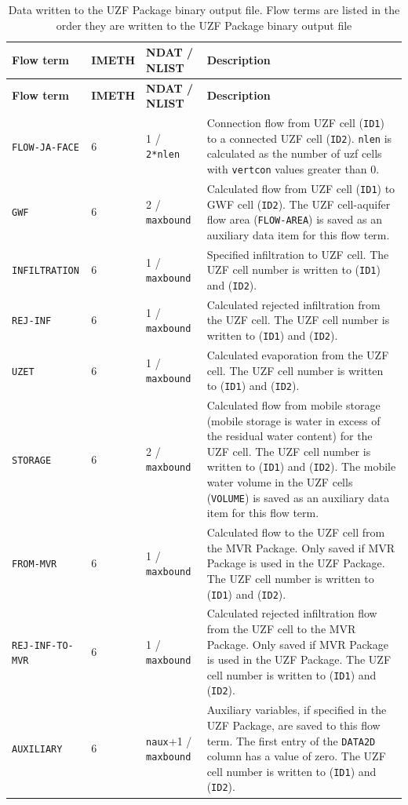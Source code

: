 \newpage
\begin{longtable}{p{3.5cm} p{2cm} p{3.5cm} p{6.5cm}}
\caption{Data written to the UZF Package binary output file. Flow terms are listed in the order they are written to the UZF Package binary output file} \tabularnewline
\hline
\hline
\textbf{Flow term} & \textbf{IMETH} & \textbf{NDAT / NLIST} & \textbf{Description} \\
\hline
\endfirsthead

\hline
\hline
\textbf{Flow term} & \textbf{IMETH} & \textbf{NDAT / NLIST} & \textbf{Description} \\
\hline
\endhead

\hline
\endfoot

\texttt{FLOW-JA-FACE} & 6 & 1 / \texttt{2*nlen} & Connection flow from UZF cell (\texttt{ID1}) to a connected UZF cell (\texttt{ID2}). \texttt{nlen} is calculated as the number of uzf cells with \texttt{vertcon} values greater than 0.\\
\texttt{GWF} & 6 & 2 / \texttt{maxbound} & Calculated flow from UZF cell (\texttt{ID1}) to GWF cell (\texttt{ID2}). The UZF cell-aquifer flow area (\texttt{FLOW-AREA}) is saved as an auxiliary data item for this flow term.\\
\texttt{INFILTRATION} & 6 & 1 / \texttt{maxbound} & Specified infiltration to UZF cell. The UZF cell number is written to (\texttt{ID1}) and (\texttt{ID2}). \\
\texttt{REJ-INF} & 6 & 1 / \texttt{maxbound} & Calculated rejected infiltration from the UZF cell. The UZF cell number is written to (\texttt{ID1}) and (\texttt{ID2}). \\
\texttt{UZET} & 6 & 1 / \texttt{maxbound} & Calculated evaporation from the UZF cell. The UZF cell number is written to (\texttt{ID1}) and (\texttt{ID2}). \\
\texttt{STORAGE} & 6 & 2 / \texttt{maxbound} & Calculated flow from mobile storage (mobile storage is water in excess of the residual water content) for the UZF cell. The UZF cell number is written to (\texttt{ID1}) and (\texttt{ID2}). The mobile water volume in the UZF cells (\texttt{VOLUME}) is saved as an auxiliary data item for this flow term.  \\
\texttt{FROM-MVR} & 6 & 1 / \texttt{maxbound} & Calculated flow to the UZF cell from the MVR Package. Only saved if MVR Package is used in the UZF Package. The UZF cell number is written to (\texttt{ID1}) and (\texttt{ID2}). \\
\texttt{REJ-INF-TO-MVR} & 6 & 1 / \texttt{maxbound} & Calculated rejected infiltration flow from the UZF cell to the MVR Package. Only saved if MVR Package is used in the UZF Package. The UZF cell number is written to (\texttt{ID1}) and (\texttt{ID2}). \\
\texttt{AUXILIARY} & 6 & \texttt{naux}+1 / \texttt{maxbound} & Auxiliary variables, if specified in the UZF Package, are saved to this flow term. The first entry of the \texttt{DATA2D} column has a value of zero.  The UZF cell number is written to (\texttt{ID1}) and (\texttt{ID2}). 
\label{table:binaryuzf}
\end{longtable}


